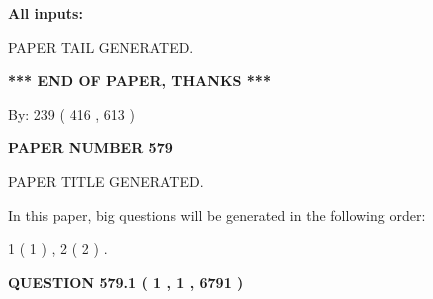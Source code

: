 \documentclass[12pt]{article}
\begin{document}
   
   
   
\noindent{}
   
   
   
   
\noindent\vspace{0.1in}\hspace{-0.08in} {\textbf{\Large{All inputs: }}}
   
   
   
   
   
   
 \vspace{0.2in}
 
   
   
\vspace{2.0in} PAPER TAIL GENERATED.
   
   
   
   
\vspace{1.0in} 
{\textbf{\large{ *** END OF PAPER, THANKS *** }}} 
   
   
\hspace{1.0in} By: 
 239 ( 416 ,  613 )
   
   
   
   
\newpage 
\setcounter{page}{ 
   579001 } 
   
   
   
   
 {\textbf{ \Large{ PAPER NUMBER  579  }}}
   
   
\vspace{0.2in}
   
   
   
   
   
   
   
   
 \vspace{0.2in}
 
 
 
 
   
   
 PAPER TITLE GENERATED.
   
   
   
\vspace{0.2in}
   
In this paper, big questions will be generated in the following order: 
   
   
   1 ( 1 )
 ,
   2 ( 2 )
 .
  
\vspace{0.2in}
  
{\textbf{\Large{QUESTION
579.1 
 ( 1 , 1 , 6791 )
}}}
  
\end{document}
